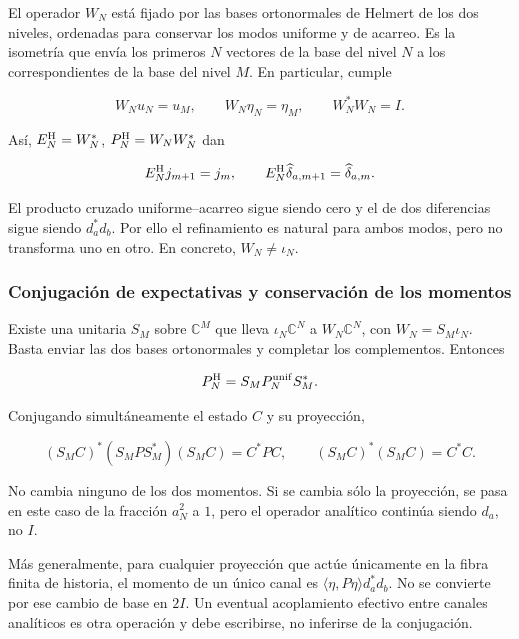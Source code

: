 El operador \(W_N\) está fijado por las bases ortonormales de Helmert
de los dos niveles, ordenadas para conservar los modos uniforme y de
acarreo. Es la isometría que envía los primeros \(N\) vectores de la
base del nivel \(N\) a los correspondientes de la base del nivel \(M\).
En particular, cumple

\begin{equation}
W_Nu_N=u_M,\qquad W_N\eta_N=\eta_M,\qquad W_N^*W_N=I.
\label{gamma-add-display-12}
\end{equation}

Así, \(E_N^{\rm H}=W_N^*\), \(P_N^{\rm H}=W_NW_N^*\) dan

\begin{equation}
E_N^{\rm H}j_{m+1}=j_m,\qquad
E_N^{\rm H}\widehat\delta_{a,m+1}=\widehat\delta_{a,m}.
\label{gamma-add-eq-5}
\end{equation}

El producto cruzado uniforme--acarreo sigue siendo cero y el de dos diferencias sigue siendo \(d_a^*d_b\). Por ello el refinamiento es natural para ambos modos, pero no transforma uno en otro. En concreto, \(W_N\ne\iota_N\).

\subsubsection{Conjugación de expectativas y conservación de los momentos}
\label{gamma-add-sub-174}

Existe una unitaria \(S_M\) sobre \(\mathbb C^M\) que lleva \(\iota_N\mathbb C^N\) a \(W_N\mathbb C^N\), con \(W_N=S_M\iota_N\). Basta enviar las dos bases ortonormales y completar los complementos. Entonces

\begin{equation}
P_N^{\rm H}=S_MP_N^{\rm unif}S_M^*.
\label{gamma-add-display-14}
\end{equation}

Conjugando simultáneamente el estado \(C\) y su proyección,

\begin{equation}
(S_MC)^*(S_MP S_M^*)(S_MC)=C^*PC,\qquad
(S_MC)^*(S_MC)=C^*C.
\label{gamma-add-eq-6}
\end{equation}

No cambia ninguno de los dos momentos. Si se cambia sólo la proyección, se pasa en este caso de la fracción \(a_N^2\) a \(1\), pero el operador analítico continúa siendo \(d_a\), no \(I\).

Más generalmente, para cualquier proyección que actúe únicamente en la fibra finita de historia, el momento de un único canal es
\(\langle\eta,P\eta\rangle d_a^*d_b\). No se convierte por ese cambio de base en \(2I\). Un eventual acoplamiento efectivo entre canales analíticos es otra operación y debe escribirse, no inferirse de la conjugación.

